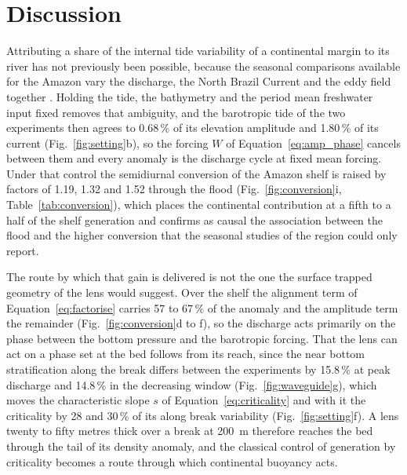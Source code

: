 \documentclass[a4paper,fleqn]{cas-sc}
\begin{document}
\section{Discussion}

Attributing a share of the internal tide variability of a continental margin to its river has not previously been possible, because the seasonal comparisons available for the Amazon vary the discharge, the North Brazil Current and the eddy field together \citep{tchilibou:2022,barbot_2021,assene:2024}. Holding the tide, the bathymetry and the period mean freshwater input fixed removes that ambiguity, and the barotropic tide of the two experiments then agrees to 0.68\,\% of its elevation amplitude and 1.80\,\% of its current (Fig.~\ref{fig:setting}b), so the forcing $W$ of Equation~\ref{eq:amp_phase} cancels between them and every anomaly is the discharge cycle at fixed mean forcing. Under that control the semidiurnal conversion of the Amazon shelf is raised by factors of 1.19, 1.32 and 1.52 through the flood (Fig.~\ref{fig:conversion}i, Table~\ref{tab:conversion}), which places the continental contribution at a fifth to a half of the shelf generation and confirms as causal the association between the flood and the higher conversion that the seasonal studies of the region could only report.

The route by which that gain is delivered is not the one the surface trapped geometry of the lens would suggest. Over the shelf the alignment term of Equation~\ref{eq:factorise} carries 57 to 67\,\% of the anomaly and the amplitude term the remainder (Fig.~\ref{fig:conversion}d to f), so the discharge acts primarily on the phase between the bottom pressure and the barotropic forcing. That the lens can act on a phase set at the bed follows from its reach, since the near bottom stratification along the break differs between the experiments by 15.8\,\% at peak discharge and 14.8\,\% in the decreasing window (Fig.~\ref{fig:waveguide}g), which moves the characteristic slope $s$ of Equation~\ref{eq:criticality} and with it the criticality by 28 and 30\,\% of its along break variability (Fig.~\ref{fig:setting}f). A lens twenty to fifty metres thick over a break at 200~m therefore reaches the bed through the tail of its density anomaly, and the classical control of generation by criticality \citep{baines:1982,garrett:2007,klymak:2011} becomes a route through which continental buoyancy acts.
\end{document}
